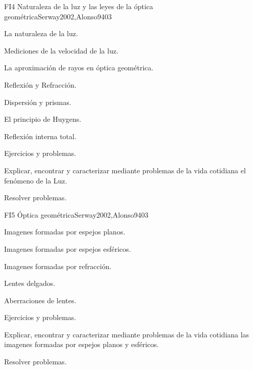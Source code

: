 \begin{syllabus}
\begin{unit}{FI4 Naturaleza de la luz y las leyes de la óptica geométrica}{Serway2002,Alonso94}{0}{3}
\begin{topics}
      \item La naturaleza de la luz.
        \item Mediciones de la velocidad de la luz.
        \item La aproximación de rayos en óptica geométrica.
        \item Reflexión y Refracción.
        \item Dispersión y prismas.
        \item El principio de Huygens.
        \item Reflexión interna total.
        \item Ejercicios y problemas.
   \end{topics}

   \begin{learningoutcomes}
      \item Explicar, encontrar y caracterizar mediante problemas de la vida cotidiana el fenómeno de la Luz.
      \item Resolver problemas.
      \end{learningoutcomes}
\end{unit}

\begin{unit}{FI5 Óptica geométrica}{Serway2002,Alonso94}{0}{3}
\begin{topics}
      \item Imagenes formadas por espejos planos.
        \item Imagenes formadas por espejos esféricos.
        \item Imagenes formadas por refracción.
        \item Lentes delgados.
        \item Aberraciones de lentes.
        \item Ejercicios y problemas.
      \end{topics}

   \begin{learningoutcomes}
      \item Explicar, encontrar y caracterizar mediante problemas de la vida cotidiana las imagenes formadas por espejos planos y esféricos.
      \item Resolver problemas.
   \end{learningoutcomes}
\end{unit}


\end{syllabus}
